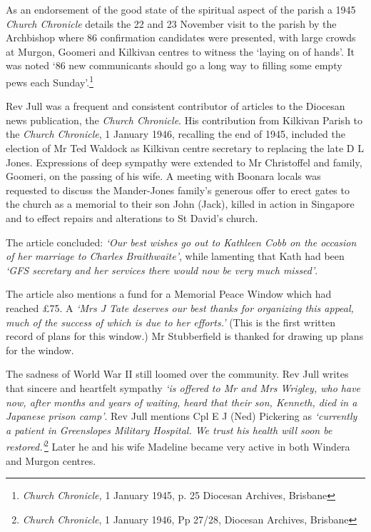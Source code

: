 As an endorsement of the good state of the spiritual aspect of the parish a 1945 \emph{Church Chronicle} details the 22 and 23 November visit to the parish by the Archbishop where 86 confirmation candidates were presented, with large crowds at Murgon, Goomeri and Kilkivan centres to witness the `laying on of hands'. It was noted `86 new communicants should go a long way to filling some empty pews each Sunday'.\footnote{\emph{Church Chronicle,} 1 January 1945, p. 25 Diocesan Archives, Brisbane}


Rev Jull was a frequent and consistent contributor of articles to the Diocesan news publication, the \emph{Church Chronicle}. His contribution from Kilkivan Parish to the \emph{Church Chronicle}, 1 January 1946, recalling the end of 1945, included the election of Mr Ted Waldock as Kilkivan centre secretary to replacing the late D L Jones. Expressions of deep sympathy were extended to Mr Christoffel and family, Goomeri, on the passing of his wife. A meeting with Boonara locals was requested to discuss the Mander-Jones family's generous offer to erect gates to the church as a memorial to their son John (Jack), killed in action in Singapore and to effect repairs and alterations to St David's church.



The article concluded: \emph{`Our best wishes go out to Kathleen Cobb on the occasion of her marriage to Charles Braithwaite'}, while lamenting that Kath had been \emph{`GFS secretary and her services there would now be very much missed'}.



The article also mentions a fund for a Memorial Peace Window which had reached \pounds75. A \emph{`Mrs J Tate deserves our best thanks for organizing this appeal, much of the success of which is due to her efforts.'} (This is the first written record of plans for this window.) Mr Stubberfield is thanked for drawing up plans for the window.



The sadness of World War II still loomed over the community. Rev Jull writes that sincere and heartfelt sympathy \emph{`is offered to Mr and Mrs Wrigley, who have now, after months and years of waiting, heard that their son, Kenneth, died in a Japanese prison camp'}. Rev Jull mentions Cpl E J (Ned) Pickering as \emph{`currently a patient in Greenslopes Military Hospital. We trust his health will soon be restored.'}\footnote{\emph{Church Chronicle}, 1 January 1946, Pp 27/28, Diocesan Archives, Brisbane} Later he and his wife Madeline became very active in both Windera and Murgon centres.


